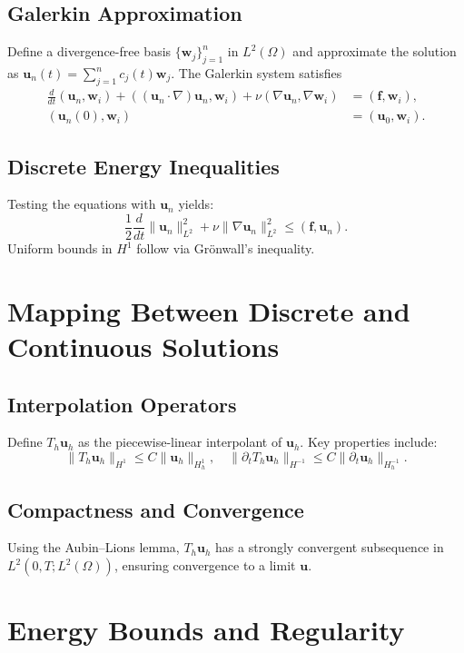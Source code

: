\subsection{Galerkin Approximation}
Define a divergence-free basis $\{\mathbf{w}_j\}_{j=1}^n$ in $L^2(\Omega)$ and approximate the solution as $\mathbf{u}_n(t) = \sum_{j=1}^n c_j(t) \mathbf{w}_j$. The Galerkin system satisfies
\begin{align}
    \frac{d}{dt}(\mathbf{u}_n, \mathbf{w}_i) + ((\mathbf{u}_n \cdot \nabla) \mathbf{u}_n, \mathbf{w}_i) + \nu (\nabla \mathbf{u}_n, \nabla \mathbf{w}_i) &= (\mathbf{f}, \mathbf{w}_i), \\
    (\mathbf{u}_n(0), \mathbf{w}_i) &= (\mathbf{u}_0, \mathbf{w}_i).
\end{align}
\subsection{Discrete Energy Inequalities}
Testing the equations with $\mathbf{u}_n$ yields:
\begin{equation}
    \frac{1}{2} \frac{d}{dt} \|\mathbf{u}_n\|_{L^2}^2 + \nu \|\nabla \mathbf{u}_n\|_{L^2}^2 \leq (\mathbf{f}, \mathbf{u}_n).
\end{equation}
Uniform bounds in $H^1$ follow via Gr\"onwall's inequality.

\section{Mapping Between Discrete and Continuous Solutions}
\subsection{Interpolation Operators}
Define $T_h \mathbf{u}_h$ as the piecewise-linear interpolant of $\mathbf{u}_h$. Key properties include:
\begin{equation}
    \|T_h \mathbf{u}_h\|_{H^1} \leq C \|\mathbf{u}_h\|_{H^1_h}, \quad \|\partial_t T_h \mathbf{u}_h\|_{H^{-1}} \leq C \|\partial_t \mathbf{u}_h\|_{H^{-1}_h}.
\end{equation}
\subsection{Compactness and Convergence}
Using the Aubin--Lions lemma, $T_h \mathbf{u}_h$ has a strongly convergent subsequence in $L^2(0,T;L^2(\Omega))$, ensuring convergence to a limit $\mathbf{u}$.

\section{Energy Bounds and Regularity}
